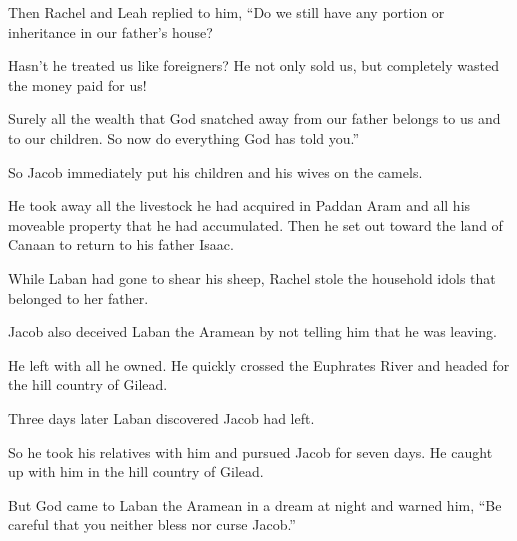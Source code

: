 \begin{scripture}
 Then Rachel and Leah replied to him, ``Do we still have any portion or inheritance in our father's house?
 Hasn't he treated us like foreigners? He not only sold us, but completely wasted the money paid for us!
 Surely all the wealth that God snatched away from our father belongs to us and to our children. So now do everything God has told you.''
\everypar{}

 So Jacob immediately put his children and his wives on the camels.
 He took away all the livestock he had acquired in Paddan Aram and all his moveable property that he had accumulated. Then he set out toward the land of Canaan to return to his father Isaac.
\everypar{}

 While Laban had gone to shear his sheep, Rachel stole the household idols that belonged to her father.
 Jacob also deceived Laban the Aramean by not telling him that he was leaving.
 He left with all he owned. He quickly crossed the Euphrates River and headed for the hill country of Gilead.
\everypar{}

 Three days later Laban discovered Jacob had left.
 So he took his relatives with him and pursued Jacob for seven days. He caught up with him in the hill country of Gilead.
 But God came to Laban the Aramean in a dream at night and warned him, ``Be careful that you neither bless nor curse Jacob.''
\everypar{}


\end{scripture}
